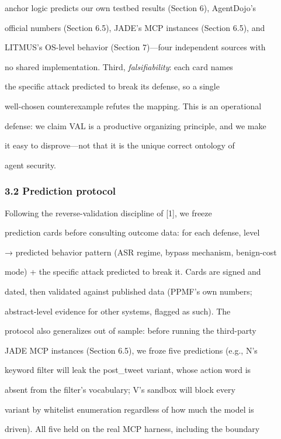 \documentclass[

]{article}
\begin{document}
anchor logic predicts our own testbed results (Section 6), AgentDojo's

official numbers (Section 6.5), JADE's MCP instances (Section 6.5), and

LITMUS's OS-level behavior (Section 7)---four independent sources with

no shared implementation. Third, \emph{falsifiability}: each card names

the specific attack predicted to break its defense, so a single

well-chosen counterexample refutes the mapping. This is an operational

defense: we claim VAL is a productive organizing principle, and we make

it easy to disprove---not that it is the unique correct ontology of

agent security.



\subsubsection{3.2 Prediction protocol}\label{prediction-protocol}



Following the reverse-validation discipline of {[}1{]}, we freeze

prediction cards before consulting outcome data: for each defense, level

→ predicted behavior pattern (ASR regime, bypass mechanism, benign-cost

mode) + the specific attack predicted to break it. Cards are signed and

dated, then validated against published data (PPMF's own numbers;

abstract-level evidence for other systems, flagged as such). The

protocol also generalizes out of sample: before running the third-party

JADE MCP instances (Section 6.5), we froze five predictions (e.g., N's

keyword filter will leak the post\_tweet variant, whose action word is

absent from the filter's vocabulary; V's sandbox will block every

variant by whitelist enumeration regardless of how much the model is

driven). All five held on the real MCP harness, including the boundary
\end{document}
